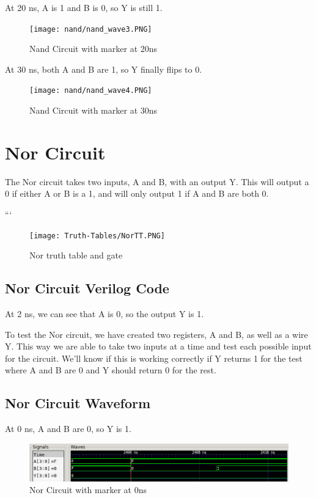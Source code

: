 \documentclass[12pt]{article}
\begin{document}
At 20 ns, A is 1 and B is 0, so Y is still 1.
\begin{figure}[H]
    \centering
    \texttt{[image: nand/nand\_wave3.PNG]}
    \caption{Nand Circuit with marker at 20ns}
    \label{fig:enter-label}
\end{figure}

At 30 ns, both A and B are 1, so Y finally flips to 0.
\begin{figure}[H]
    \centering
    \texttt{[image: nand/nand\_wave4.PNG]}
    \caption{Nand Circuit with marker at 30ns}
    \label{fig:enter-label}
\end{figure}

\section{Nor Circuit}
The Nor circuit takes two inputs, A and B, with an output Y. This will output a 0 if either A or B is a 1, and will only output 1 if A and B are both 0.

```\begin{figure}[H]
    \centering
    \texttt{[image: Truth-Tables/NorTT.PNG]}
    \caption{Nor truth table and gate}
    \label{fig:shift-table}
\end{figure}

\subsection{Nor Circuit Verilog Code}
At 2 ns, we can see that  A is 0, so the output Y is 1.


To test the Nor circuit, we have created two registers, A and B, as well as a wire Y. This way we are able to take two inputs at a time and test each possible input for the circuit. We'll know if this is working correctly if Y returns 1 for the test where A and B are 0 and Y should return 0 for the rest.

\subsection{Nor Circuit Waveform}

At 0 ns, A and B are 0, so Y is 1.
\begin{figure}[H]
    \centering
    \includegraphics[width = 1.0\textwidth]{nor/nor_wave1.PNG}
    \caption{Nor Circuit with marker at 0ns}
    \label{fig:enter-label}
\end{figure}
\end{document}
